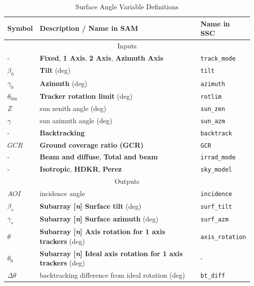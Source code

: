 \documentclass[12pt,letterpaper]{article}
\newcommand\GCR{\ensuremath{\mathit{GCR}}}
\newcommand\AOI{\ensuremath{\mathit{AOI}}}
\begin{document}
\begin{table}
\begin{center}
\caption{Surface Angle Variable Definitions}
\begin{tabular}{lll}
\midrule
Symbol & Description / \textbf{Name in SAM} & Name in SSC\\
\midrule
\multicolumn{3}{c}{Inputs}\\
- & \textbf{Fixed}, \textbf{1 Axis}, \textbf{2 Axis}, \textbf{Azimuth Axis} & \texttt{track\_mode}\\
$\beta_0$ & \textbf{Tilt} (deg)& \texttt{tilt}\\
$\gamma_0$ & \textbf{Azimuth} (deg) & \texttt{azimuth}\\
$\theta_{\mathrm{lim}}$ & \textbf{Tracker rotation limit} (deg) & \texttt{rotlim}\\
$Z$ & sun zenith angle (deg) & \texttt{sun\_zen}\\
$\gamma$ & sun azimuth angle (deg) & \texttt{sun\_azm}\\
- & \textbf{Backtracking }& \texttt{backtrack}\\
$\GCR$ & \textbf{Ground coverage ratio (GCR)} & \texttt{GCR}\\
- & \textbf{Beam and diffuse}, \textbf{Total and beam} & \texttt{irrad\_mode}\\
- & \textbf{Isotropic}, \textbf{HDKR}, \textbf{Perez} & \texttt{sky\_model}\\
\midrule
\multicolumn{3}{c}{Outputs}\\
$\AOI$ & incidence angle & \texttt{incidence}\\
$\beta_s$ & \textbf{Subarray [\textit{n}] Surface tilt} (deg) & \texttt{surf\_tilt}\\
$\gamma_s$ & \textbf{Subarray [\textit{n}] Surface azimuth} (deg) & \texttt{surf\_azm}\\
$\theta$ & \textbf{Subarray [\textit{n}] Axis rotation for 1 axis trackers} (deg) & \texttt{axis\_rotation}\\
$\theta_0$ & \textbf{Subarray [\textit{n}] Ideal axis rotation for 1 axis trackers} (deg) & -\\
$\Delta\theta$ & backtracking difference from ideal rotation (deg) & \texttt{bt\_diff}\\
\midrule
\end{tabular}
\label{tab-surfaceanglevars}
\end{center}
\end{table}
\end{document}
